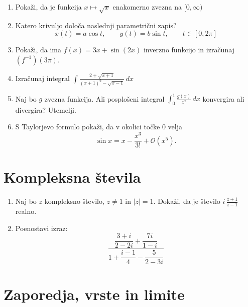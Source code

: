 \documentclass[a4paper,12pt]{article}
\begin{document}
\begin{enumerate}
\item
Pokaži, da je funkcija \(x \mapsto \sqrt{x}\) enakomerno zvezna na \([0,\infty)\)

\item
Katero krivuljo določa naslednji parametrični zapis?
\[
x(t) = a \cos t, \qquad %
y(t) = b \sin t, \qquad %
t \in [0, 2 \pi]
\]

\item
Pokaži, da ima \(f(x)= 3x + \sin(2x)\) inverzno funkcijo in izračunaj \((f^{-1})(3\pi)\).

\item
Izračunaj integral
\(\displaystyle \int \frac{2 + \sqrt{x + 1}}{(x + 1)^2 - \sqrt{x - 1}} \, dx\)


\item
Naj bo \(g\) zvezna funkcija. Ali posplošeni integral
\(\int_0^1 \frac{g(x)}{x^2}\,dx\)
konvergira ali divergira? Utemelji.

\item
S Taylorjevo formulo pokaži, da v okolici točke \(0\) velja
\[
\sin x = x - \frac{x^3}{3!} + \mathcal{O} (x^5).
\]
\end{enumerate}

\section*{Kompleksna števila}

\begin{enumerate}
\item
Naj bo \(z\) kompleksno število, \(z \ne 1\) in \(|z| = 1\).
Dokaži, da je število \( i \, \frac{z+1}{z-1} \) realno.

\item
Poenostavi izraz:
\[
\frac{\dfrac{3 + i}{2 - 2i} + \dfrac{7i}{1 - i}}{1 + \dfrac{i - 1}{4} - \dfrac{5}{2 - 3i}}
\]
\end{enumerate}

\section*{Zaporedja, vrste in limite}
\end{document}
